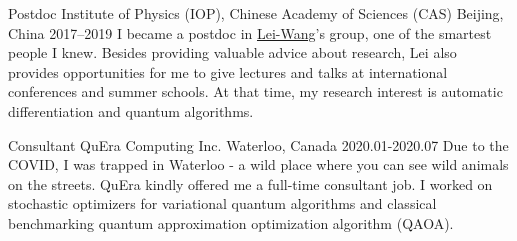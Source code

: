 \documentclass[11pt, a4paper]{awesome-cv}
\begin{document}
\begin{cvskills}
\end{cvskills}
\begin{cventries}
  \cventry
    {Postdoc}
    {Institute of Physics (IOP), Chinese Academy of Sciences (CAS)}
    {Beijing, China}
    {2017--2019}
    {
      I became a postdoc in \href{http://wangleiphy.github.io/}{Lei-Wang}'s group, one of the smartest people I knew. Besides providing valuable advice about research, Lei also provides opportunities for me to give lectures and talks at international conferences and summer schools. At that time, my research interest is automatic differentiation and quantum algorithms.
    }

  \cventry
    {Consultant}
    {QuEra Computing Inc.}
    {Waterloo, Canada}
    {2020.01-2020.07}  %
    {
        Due to the COVID, I was trapped in Waterloo - a wild place where you can see wild animals on the streets. QuEra kindly offered me a full-time consultant job. I worked on stochastic optimizers for variational quantum algorithms and classical benchmarking quantum approximation optimization algorithm (QAOA).    }


\end{cventries}
\end{document}
